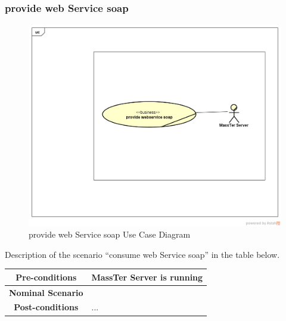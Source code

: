 \documentclass[12pt]{article}
\begin{document}
	 \subsubsection{provide web Service soap} 
	 	\begin{figure}[h]
	 	\centering
	 	\includegraphics[width=1.0\textwidth]{provideWebServiceSoap.png}
	 	\caption{provide web Service soap Use Case Diagram}
	 	
	 \end{figure}
  Description of the scenario ``consume web Service soap'' in the table below.
   \begin{table}
  	\centering
  	\begin{tabular}{|c|p{10cm}|}
  		\hline 	
  		\textbf{Pre-conditions } & MassTer Server is running  \\ 
  		\hline                     
  		\textbf{Nominal Scenario } & \\ 
  		\hline 
  		\textbf{Post-conditions} & ... \\
  		\hline 
  	\end{tabular}
  \end{table}
 \clearpage
 \newpage
\end{document}
